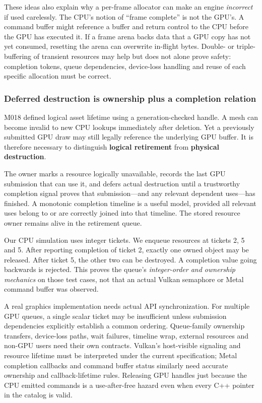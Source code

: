 These ideas also explain why a per-frame allocator can make an engine \emph{incorrect} if used carelessly. The CPU's notion of ``frame complete'' is not the GPU's. A command buffer might reference a buffer and return control to the CPU before the GPU has executed it. If a frame arena backs data that a GPU copy has not yet consumed, resetting the arena can overwrite in-flight bytes. Double- or triple-buffering of transient resources may help but does not alone prove safety: completion tokens, queue dependencies, device-loss handling and reuse of each specific allocation must be correct.

\subsubsection{Deferred destruction is ownership plus a completion relation}\label{deferred-destruction-is-ownership-plus-a-completion-relation}

M018 defined logical asset lifetime using a generation-checked handle. A mesh can become invalid to new CPU lookups immediately after deletion. Yet a previously submitted GPU draw may still legally reference the underlying GPU buffer. It is therefore necessary to distinguish \textbf{logical retirement} from \textbf{physical destruction}.

The owner marks a resource logically unavailable, records the last GPU submission that can use it, and defers actual destruction until a trustworthy completion signal proves that submission---and any relevant dependent uses---has finished. A monotonic completion timeline is a useful model, provided all relevant uses belong to or are correctly joined into that timeline. The stored resource owner remains alive in the retirement queue.

Our CPU simulation uses integer tickets. We enqueue resources at tickets 2, 5 and 5. After reporting completion of ticket 2, exactly one owned object may be released. After ticket 5, the other two can be destroyed. A completion value going backwards is rejected. This proves the queue's \emph{integer-order and ownership mechanics} on those test cases, not that an actual Vulkan semaphore or Metal command buffer was observed.

A real graphics implementation needs actual API synchronization. For multiple GPU queues, a single scalar ticket may be insufficient unless submission dependencies explicitly establish a common ordering. Queue-family ownership transfers, device-loss paths, wait failures, timeline wrap, external resources and non-GPU users need their own contracts. Vulkan's host-visible signaling and resource lifetime must be interpreted under the current specification; Metal completion callbacks and command buffer status similarly need accurate ownership and callback-lifetime rules. Releasing GPU handles just because the CPU emitted commands is a use-after-free hazard even when every C++ pointer in the catalog is valid.

